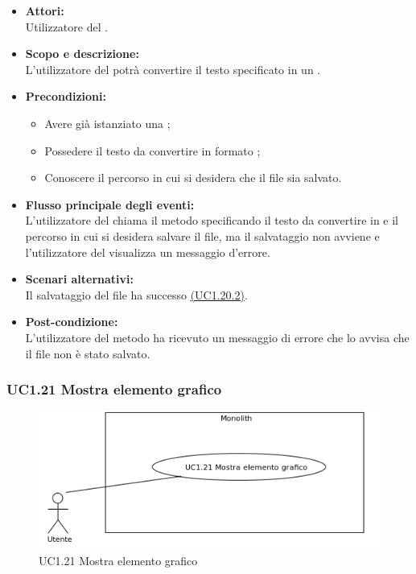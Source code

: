 \begin{itemize}
	\item \textbf{Attori:}
	\\Utilizzatore del .
	\item \textbf{Scopo e descrizione:} 
	\\L’utilizzatore del  potrà convertire il testo specificato in un .
	\item \textbf{Precondizioni:}
	\begin{itemize}
		\item Avere già istanziato una ;
		\item Possedere il testo da convertire in formato ;
		\item Conoscere il percorso in cui si desidera che il file sia salvato.
	\end{itemize}
	\item \textbf{Flusso principale degli eventi:}
	\\L’utilizzatore del  chiama il metodo specificando il testo da convertire in  e il percorso in cui si desidera salvare il file, ma il salvataggio non avviene e l’utilizzatore del  visualizza un messaggio d’errore.
	\item \textbf{Scenari alternativi:}
	\\Il salvataggio del file  ha successo \hyperref[UC1.20.2]{(UC1.20.2)}.
	\item \textbf{Post-condizione:}
	\\L’utilizzatore del metodo ha ricevuto un messaggio di errore che lo avvisa che il file  non è stato salvato.
\end{itemize}

\subsubsection{UC1.21 Mostra elemento grafico} \label{UC1.21}

\begin{figure}[H]
	\centering
	\includegraphics[width=15cm]{../../documenti/AnalisiDeiRequisiti/Diagrammi_img/uc1_21.png}
	\caption{UC1.21 Mostra elemento grafico}
\end{figure}

